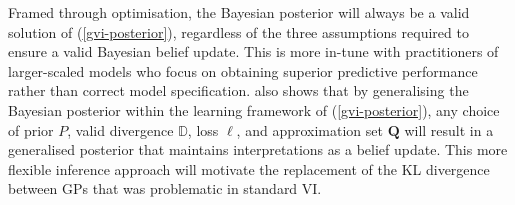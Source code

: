 \documentclass{article}
\numberwithin{equation}{section}
\begin{document}
Framed through optimisation, the Bayesian posterior will always be a valid solution of (\ref{gvi-posterior}), regardless of the three assumptions required to ensure a valid Bayesian belief update.
This is more in-tune with practitioners of larger-scaled models who focus on obtaining superior predictive performance rather than correct model specification.
\cite{knoblauch2022optimization} also shows that by generalising the Bayesian posterior within the learning framework of (\ref{gvi-posterior}), any choice of prior $P$, valid divergence $\mathbb{D}$, loss $\ell$, and approximation set $\boldsymbol{Q}$ will result in a generalised posterior that maintains interpretations as a belief update.
This more flexible inference approach will motivate the replacement of the KL divergence between GPs that was problematic in standard VI.
\end{document}
